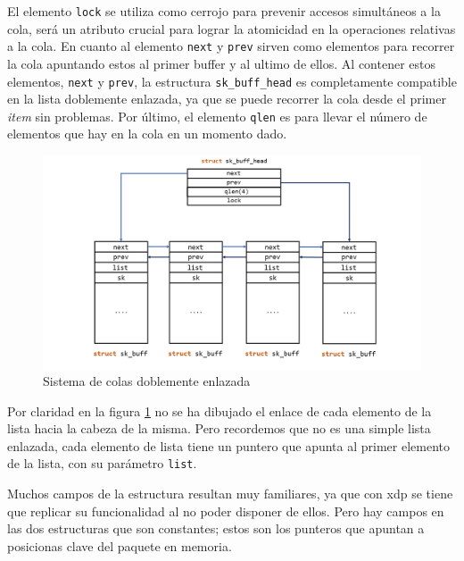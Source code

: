 El elemento \texttt{lock} se utiliza como cerrojo para prevenir accesos simultáneos a la cola, será un atributo crucial para lograr la atomicidad en la operaciones relativas a la cola. En cuanto al elemento \texttt{next} y \texttt{prev} sirven como elementos para recorrer la cola apuntando estos al primer buffer y al ultimo de ellos. Al contener estos elementos, \texttt{next} y \texttt{prev}, la estructura \texttt{sk\_buff\_head} es completamente compatible en la lista doblemente enlazada, ya que se puede recorrer la cola desde el primer \textit{item} sin problemas. Por último, el elemento \texttt{qlen} es para llevar el número de elementos que hay en la cola en un momento dado.\\
\par

\begin{figure}[ht]
    \centering
    \includegraphics[width=16cm]{archivos/img/teoria/sk_buff_queue.png}
    \caption{Sistema de colas doblemente enlazada}
    \label{fig:linuxNet_skbuff1}
\end{figure}

Por claridad en la figura \ref{fig:linuxNet_skbuff1} no se ha dibujado el enlace de cada elemento de la lista hacia la cabeza de la misma. Pero recordemos que no es una simple lista enlazada, cada elemento de lista tiene un puntero que apunta al primer elemento de la lista, con su parámetro \texttt{list}.\\
\par
Muchos campos de la estructura resultan muy familiares, ya que con \gls{xdp} se tiene que replicar su funcionalidad al no poder disponer de ellos. Pero hay campos en las dos estructuras que son constantes; estos son los punteros que apuntan a posicionas clave del paquete en  memoria.\\
\par

